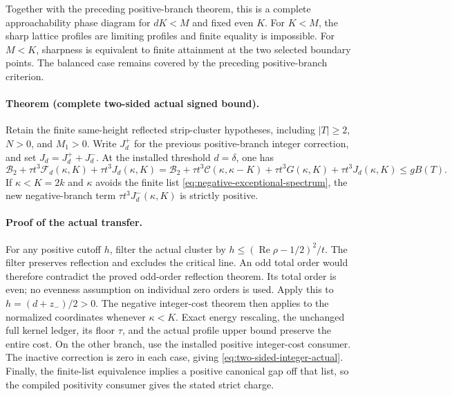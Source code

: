 Together with the preceding positive-branch theorem, this is a complete
approachability phase diagram for \(dK<M\) and fixed even \(K\).
For \(K<M\), the sharp lattice profiles are limiting profiles and finite
equality is impossible.  For \(M<K\), sharpness is equivalent to finite
attainment at the two selected boundary points.  The balanced case remains
covered by the preceding positive-branch criterion.

\paragraph{Theorem (complete two-sided actual signed bound).}
Retain the finite same-height reflected strip-cluster hypotheses, including
\(|T|\ge2\), \(N>0\), and \(M_1>0\).  Write \(J^+_d\) for the previous
positive-branch integer correction, and set
\(J_d=J^+_d+J^-_d\).  At the installed threshold \(d=\delta\), one has
\begin{equation}
 \mathcal B_2+\tau t^3\mathcal F_d(\kappa,K)+\tau t^3J_d(\kappa,K)
 =\mathcal B_2+\tau t^3\mathcal C(\kappa,\kappa-K)
     +\tau t^3G(\kappa,K)+\tau t^3J_d(\kappa,K)\le gB(T).
 \label{eq:two-sided-integer-actual}
\end{equation}
If \(\kappa<K=2k\) and \(\kappa\) avoids the finite list
\eqref{eq:negative-exceptional-spectrum}, the new negative-branch term
\(\tau t^3J^-_d(\kappa,K)\) is strictly positive.

\paragraph{Proof of the actual transfer.}
For any positive cutoff \(h\), filter the actual cluster by
\(h\le(\operatorname{Re}\rho-1/2)^2/t\).  The filter preserves reflection
and excludes the critical line.  An odd total order would therefore
contradict the proved odd-order reflection theorem.  Its total order is
even; no evenness assumption on individual zero orders is used.
Apply this to \(h=(d+z_-)/2>0\).  The negative integer-cost theorem then
applies to the normalized coordinates whenever \(\kappa<K\).  Exact
energy rescaling, the unchanged full kernel ledger, its floor \(\tau\),
and the actual profile upper bound preserve the entire cost.  On the other
branch, use the installed positive integer-cost consumer.  The inactive
correction is zero in each case, giving
\eqref{eq:two-sided-integer-actual}.  Finally, the finite-list equivalence
implies a positive canonical gap off that list, so the compiled positivity
consumer gives the stated strict charge.

